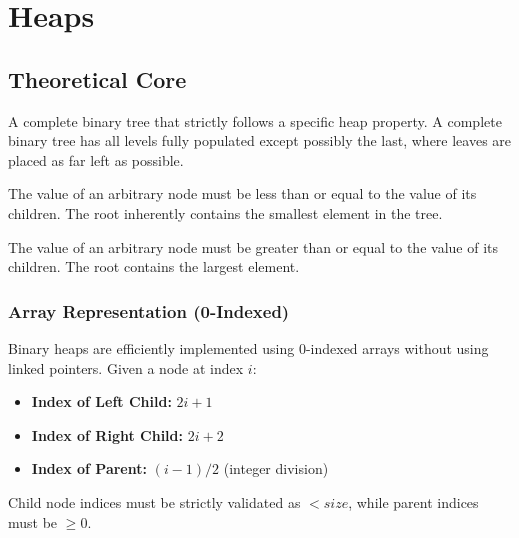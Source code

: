 \chapter{Heaps}

\section{Theoretical Core}

\begin{definition}
A complete binary tree that strictly follows a specific heap property. A complete binary tree has all levels fully populated except possibly the last, where leaves are placed as far left as possible.
\end{definition}

\begin{definition}
The value of an arbitrary node must be less than or equal to the value of its children. The root inherently contains the smallest element in the tree.
\end{definition}

\begin{definition}
The value of an arbitrary node must be greater than or equal to the value of its children. The root contains the largest element.
\end{definition}

\subsection{Array Representation (0-Indexed)}
Binary heaps are efficiently implemented using 0-indexed arrays without using linked pointers.
Given a node at index $i$:
\begin{itemize}
    \item \textbf{Index of Left Child:} $2i + 1$
    \item \textbf{Index of Right Child:} $2i + 2$
    \item \textbf{Index of Parent:} $(i - 1) / 2$ (integer division)
\end{itemize}
\begin{remark}
Child node indices must be strictly validated as $< size$, while parent indices must be $\ge 0$.
\end{remark}

